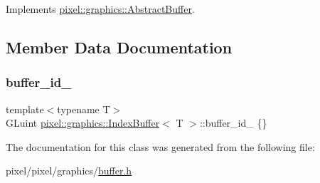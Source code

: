 Implements \hyperlink{classpixel_1_1graphics_1_1_abstract_buffer_aee49569fa5c1767a40f2371ec96e40fc}{pixel\+::graphics\+::\+Abstract\+Buffer}.



\subsection{Member Data Documentation}
\mbox{\label{classpixel_1_1graphics_1_1_index_buffer_a85ecce71a34c017da3d2f45d89a07d11}} 
\subsubsection{\texorpdfstring{buffer\+\_\+id\+\_\+}{buffer\_id\_}}
{\footnotesize\ttfamily template$<$typename T$>$ \\
G\+Luint \hyperlink{classpixel_1_1graphics_1_1_index_buffer}{pixel\+::graphics\+::\+Index\+Buffer}$<$ T $>$\+::buffer\+\_\+id\+\_\+ \{\}\hspace{0.3cm}{\ttfamily [private]}}



The documentation for this class was generated from the following file\+:\begin{DoxyCompactItemize}
\item 
pixel/pixel/graphics/\hyperlink{buffer_8h}{buffer.\+h}\end{DoxyCompactItemize}
